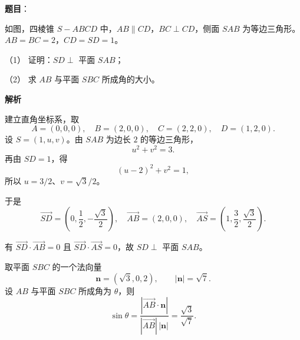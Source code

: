 \begin{answer}

\textbf{题目}：

如图，四棱锥 $S-ABCD$ 中，$AB\parallel CD$，$BC\perp CD$，侧面 $SAB$ 为等边三角形。$AB=BC=2$，$CD=SD=1$。
\nopagebreak[4]
\begin{center}\end{center}
\nopagebreak[4]
（1） 证明：$SD\perp$ 平面 $SAB$；

（2） 求 $AB$ 与平面 $SBC$ 所成角的大小。

\textbf{解析}


建立直角坐标系，取
\nopagebreak[4]
\[
A=(0,0,0),\quad B=(2,0,0),\quad
C=(2,2,0),\quad D=(1,2,0).
\]
设 $S=(1,u,v)$。由 $SAB$ 为边长 $2$ 的等边三角形，
\nopagebreak[4]
\[
u^2+v^2=3.
\]
再由 $SD=1$，得
\nopagebreak[4]
\[
(u-2)^2+v^2=1,
\]
所以 $u=3/2$、$v=\sqrt3/2$。

于是
\nopagebreak[4]
\[
\overrightarrow{SD}=\left(0,\frac12,-\frac{\sqrt3}{2}\right),
\quad
\overrightarrow{AB}=(2,0,0),
\quad
\overrightarrow{AS}=\left(1,\frac32,\frac{\sqrt3}{2}\right).
\]

有 $\overrightarrow{SD}\cdot\overrightarrow{AB}=0$ 且
$\overrightarrow{SD}\cdot\overrightarrow{AS}=0$，故
$SD\perp$ 平面 $SAB$。


取平面 $SBC$ 的一个法向量
\nopagebreak[4]
\[
\boldsymbol n=(\sqrt3,0,2),\qquad |\boldsymbol n|=\sqrt7.
\]
设 $AB$ 与平面 $SBC$ 所成角为 $\theta$，则
\nopagebreak[4]
\[
\sin\theta
=\frac{|\overrightarrow{AB}\cdot\boldsymbol n|}
{|\overrightarrow{AB}|\,|\boldsymbol n|}
=\frac{\sqrt3}{\sqrt7}.
\]



\end{answer}
